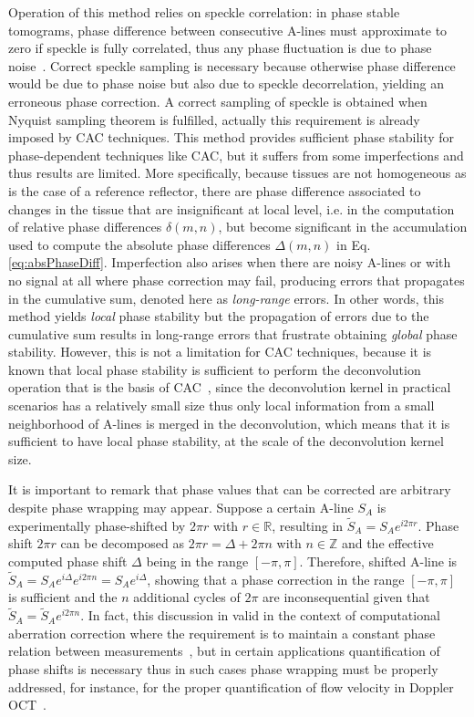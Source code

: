Operation of this method relies on speckle correlation: in phase stable tomograms, phase difference between consecutive A-lines must approximate to zero if speckle is fully correlated, thus any phase fluctuation is due to phase noise~\cite{White2003_vivo}. Correct speckle sampling is necessary because otherwise phase difference would be due to phase noise but also due to speckle decorrelation, yielding an erroneous phase correction. A correct sampling of speckle is obtained when Nyquist sampling theorem is fulfilled, actually this requirement is already imposed by CAC techniques. This method provides sufficient phase stability for phase-dependent techniques like CAC, but it suffers from some imperfections and thus results are limited. More specifically, because tissues are not homogeneous as is the case of a reference reflector, there are phase difference associated to changes in the tissue that are insignificant at local level, i.e. in the computation of relative phase differences $\delta(m,n)$, but become significant in the accumulation used to compute the absolute phase differences $\Delta(m,n)$ in Eq.\eqref{eq:absPhaseDiff}. Imperfection also arises when there are noisy A-lines or with no signal at all where phase correction may fail, producing errors that propagates in the cumulative sum, denoted here as \textit{long-range} errors. In other words, this method yields \textit{local} phase stability but the propagation of errors due to the cumulative sum results in long-range errors that frustrate obtaining \textit{global} phase stability. However, this is not a limitation for CAC techniques, because it is known that local phase stability is sufficient to perform the deconvolution operation that is the basis of CAC~\cite{Shemonski2014_Stability}, since the deconvolution kernel in practical scenarios has a relatively small size thus only local information from a small neighborhood of A-lines is merged in the deconvolution, which means that it is sufficient to have local phase stability, at the scale of the deconvolution kernel size.

It is important to remark that phase values that can be corrected are arbitrary despite phase wrapping may appear. Suppose a certain A-line $S_A$ is experimentally phase-shifted by $2\pi r$ with $r\in\mathbb{R}$, resulting in $\tilde{S}_A=S_Ae^{i2\pi r}$. Phase shift $2\pi r$ can be decomposed as $2\pi r = \Delta + 2\pi n$ with $n\in \mathbb{Z}$ and the effective computed phase shift $\Delta$ being in the range $[-\pi, \pi]$. Therefore, shifted A-line is $\tilde{S}_A=S_Ae^{i\Delta} e^{i2\pi n}=S_A e^{i\Delta}$, showing that a phase correction in the range $[-\pi, \pi]$ is sufficient and the $n$ additional cycles of $2\pi$ are inconsequential given that $\tilde{S}_A = \tilde{S}_Ae^{i2\pi n}$. In fact, this discussion in valid in the context of computational aberration correction where the requirement is to maintain a constant phase relation between measurements~\cite{Shemonski2014_Stability}, but in certain applications quantification of phase shifts is necessary thus in such cases phase wrapping must be properly addressed, for instance, for the proper quantification of flow velocity in Doppler OCT~\cite{Hong2012_Highpenetration}.

